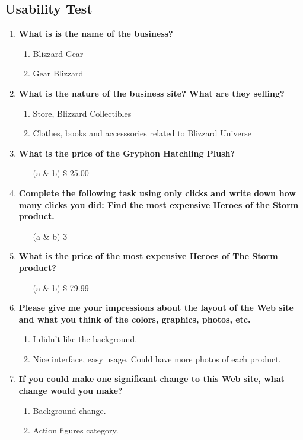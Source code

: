 		\subsection{Usability Test}
			\begin{enumerate}
				\item{\textbf{What is is the name of the business?}
				\begin{enumerate}
					\item Blizzard Gear
					\item Gear Blizzard
				\end{enumerate}
				}
				\item{\textbf{What is the nature of the business site? What are they selling?}
				\begin{enumerate}
					\item Store, Blizzard Collectibles
					\item Clothes, books and accesssories related to Blizzard Universe
				\end{enumerate}
				}
				\item{\textbf{What is the price of the Gryphon Hatchling Plush?}
				\begin{enumerate}
					\item[(a \& b)] \$ 25.00
				\end{enumerate}
				}
				\item{\textbf{Complete the following task using only clicks and write down how many clicks you did: Find the most expensive Heroes of the Storm product.}
				\begin{enumerate}
					\item[(a \& b)] 3
				\end{enumerate}
				}
				\item{\textbf{What is the price of the most expensive Heroes of The Storm product?}
				\begin{enumerate}
					\item[(a \& b)] \$ 79.99
				\end{enumerate}
				}
				\item{\textbf{Please give me your impressions about the layout of the Web site and what you think of the colors, graphics, photos, etc.}
				\begin{enumerate}
					\item I didn't like the background.
					\item Nice interface, easy usage. Could have more photos of each product.
				\end{enumerate}
				}
				\item{\textbf{If you could make one significant change to this Web site, what change would you make?}
				\begin{enumerate}
					\item Background change.
					\item Action figures category.
				\end{enumerate}
				}
			\end{enumerate}
